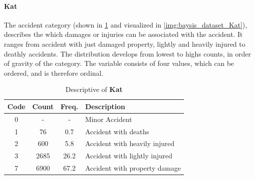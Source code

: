 \paragraph{Kat}
\label{baysis_dataset_Kat}
The accident category (shown in \cref{tbl:baysis_dataset_Kat} and visualized in \cref{img:baysis_dataset_Kat}), describes the which damages or injuries can be associated with the accident. It ranges from accident with just  damaged property, lightly and heavily injured to deathly accidents. The distribution develops from lowest to highs counts, in order of gravity of the category. The variable consists of four values, which can be ordered, and is therefore ordinal.
\begin{table}[!ht]
	\centering
	\small
	\begin{tabular}{c|c|c|l} 
		\toprule
		Code & Count & Freq. & Description \\ 
		\midrule
 		0 	& - 	& 	-	& Minor Accident  \\
 		1 	& 76 	& 0.7 	& Accident with deaths  \\ 
 		2 	& 600	& 5.8	& Accident with heavily injured  \\
 		3 	& 2685	& 26.2	& Accident with lightly injured  \\
		7 	& 6900	& 67.2	& Accident with property damage  \\
		\bottomrule
	\end{tabular}
	\caption{Descriptive of \textbf{Kat}}
	\label{tbl:baysis_dataset_Kat}
\end{table}

